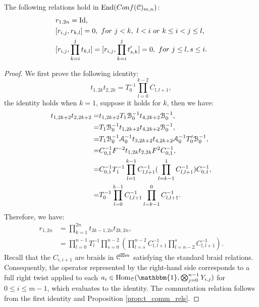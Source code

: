 \documentclass{amsart}
\begin{document}
\begin{prop}\label{prop:r_comm_rels}
 The following relations hold in $\operatorname{End}(Conf({\mathcal{C}})_{m,n})$:
\[
\begin{aligned}
&r_{1,2n}=\operatorname{Id},\\
&[r_{i,j},r_{k,l}]=0,\  for\ j<k,\  l<i\ or\  k\leq i<j\leq l,\\
&[r_{i,j},\prod^{j}_{k=i} t_{k,l}]=[r_{i,j},\prod^{j}_{k=i} t'_{s,k}]=0,\  for\ j\leq l, s\leq i.
\end{aligned}
\]
\end{prop}
\begin{proof}
We first prove the following identity:
\[
t_{1,2k}t_{2,2k}=T_0^{-1}\prod^{k-2}_{l=0}C_{l,l+1},
\]
the identity holds when $k=1$, suppose it holds for $k$, then we have:
\[
\begin{aligned}
t_{1,2k+2}t_{2,2k+2}=&t_{1,2k+2}T_1\mathcal{B}^{-1}_0t_{4,2k+2}\mathcal{B}^{-1}_0,\\
=&T_1\mathcal{B}^{-1}_0t_{1,2k+2}t_{4,2k+2}\mathcal{B}^{-1}_0,\\
=&T_1\mathcal{B}^{-1}_0\mathcal{A}^{-1}_0t_{3,2k+2}t_{4,2k+2}\mathcal{A}^{-1}_0T'_0\mathcal{B}^{-1}_0,\\
=&C^{-1}_{0,1}F^{-2}t_{1,2k}t_{2,2k}F^2C^{-1}_{0,1},\\
=&C^{-1}_{0,1}T_1^{-1}\prod^{k-1}_{l=1}C^{-1}_{l,l+1}(\prod^{1}_{l=k-1}C^{-1}_{l,l+1})C^{-1}_{0,1},\\
=&T_0^{-1}\prod^{k-1}_{l=0}C^{-1}_{l,l+1}\prod^{0}_{l=k-1}C^{-1}_{l,l+1}.
\end{aligned}
\]
 Therefore, we have:
\[
\begin{aligned}
r_{1,2n}&=\prod^{2n}_{k=1}t_{2k-1,2n}t_{2k,2n},\\ 
&=\prod^{n-1}_{l=0}T_l^{-1}\prod^{n-2}_{s=0}(\prod^{n-2}_{l=s}C^{-1}_{l,l+1}\prod^{s}_{l=n-2}C^{-1}_{l,l+1}).
\end{aligned}
\]
Recall that the $C_{i,i+1}$ are braids in ${\mathcal{C}}^{\boxtimes m}$ satisfying the standard braid relations. Consequently, the operator represented by the right-hand side corresponds to a full right twist applied to each $a_i\in \Hom_{\CC}(\mathbbm{1}, \bigotimes^{n-1}_{j=0} Y_{i,j})$ for $0\leq i\leq m-1$, which evaluates to the identity.
The commutation relation follows from the first identity and Proposition \ref{prop:t_comm_rels}.
\end{proof}
\end{document}
